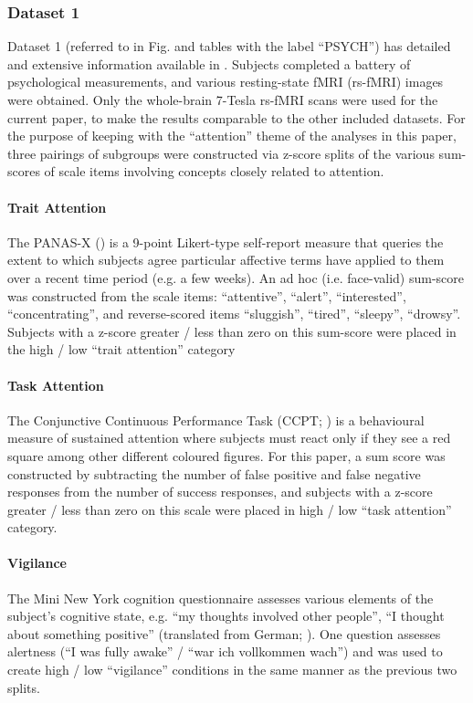 \subsubsection{Dataset 1}
Dataset 1 (referred to in Fig. and tables with the label ``PSYCH'') has detailed and extensive
information available in \cite{gorgolewskiHighResolution7Tesla2015}. Subjects completed a battery of
psychological measurements, and various resting-state fMRI (rs-fMRI) images were obtained. Only the
whole-brain 7-Tesla rs-fMRI scans were used for the current paper, to make the results comparable to
the other included datasets. For the purpose of keeping with the ``attention'' theme of the analyses
in this paper, three pairings of subgroups were constructed via z-score splits of the various
sum-scores of scale items involving concepts closely related to attention.

\paragraph{Trait Attention}
The PANAS-X (\cite{watsonPANASXManualPositive1994}) is a 9-point Likert-type self-report measure
that queries the extent to which subjects agree particular affective terms have applied to them over
a recent time period (e.g. a few weeks). An ad hoc (i.e. face-valid) sum-score was constructed from
the scale items: ``attentive'', ``alert'', ``interested'', ``concentrating'', and reverse-scored items
``sluggish'', ``tired'', ``sleepy'', ``drowsy''. Subjects with a z-score greater / less than zero on this
sum-score were placed in the high / low ``trait attention'' category

\paragraph{Task Attention}
The Conjunctive Continuous Performance Task (CCPT;
\cite{shalevConjunctiveContinuousPerformance2011}) is a behavioural measure of sustained attention
where subjects must react only if they see a red square among other different coloured figures. For
this paper, a sum score was constructed by subtracting the number of false positive and false
negative responses from the number of success responses, and subjects with a z-score greater / less
than zero on this scale were placed in high / low ``task attention'' category.

\paragraph{Vigilance}
The Mini New York cognition questionnaire assesses various elements of the subject's cognitive
state, e.g. ``my thoughts involved other people'', ``I thought about something positive'' (translated
from German; \cite{gorgolewskiCorrespondenceIndividualDifferences2014}). One question assesses
alertness (``I was fully awake'' / ``war ich vollkommen wach'') and was used to create high / low
``vigilance'' conditions in the same manner as the previous two splits.

